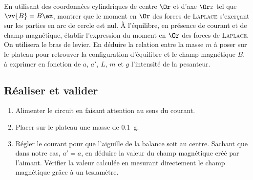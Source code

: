\documentclass[a4paper, 11pt, final, garamond]{book}
\begin{document}
\begin{enumerate}
  \sqitem[6] En utilisant des coordonnées cylindriques de centre $\Or$ et d'axe $\Or
    z$ tel que $\vv{B} = B\ez$, montrer que le moment en $\Or$ des forces de
    \textsc{Laplace} s'exerçant sur les parties en arc de cercle est nul.
  \sqitem[7] À l'équilibre, en présence de courant et de champ magnétique,
  établir l'expression du moment en $\Or$ des forces de \textsc{Laplace}. On
  utilisera le bras de levier.
  \sqitem[8] En déduire la relation entre la masse $m$ à poser sur le plateau
  pour retrouver la configuration d'équilibre et le champ magnétique $B$, à
  exprimer en fonction de $a$, $a'$, $L$, $m$ et $g$ l'intensité de la
  pesanteur.
\end{enumerate}

\subsection{Réaliser et valider}
\label{ssec:cottonreal}
\begin{enumerate}
  \item Alimenter le circuit en faisant attention au sens du courant.
  \item Placer sur le plateau une masse de \SI{0.1}{g}.
  \item Régler le courant pour que l'aiguille de la balance soit au centre.
  \sqitem[9] Sachant que dans notre cas, $a' = a$, en déduire la valeur du
  champ magnétique créé par l'aimant.
  \sqitem[10] Vérifier la valeur calculée en mesurant directement le champ
  magnétique grâce à un teslamètre.
\end{enumerate}
\end{document}

